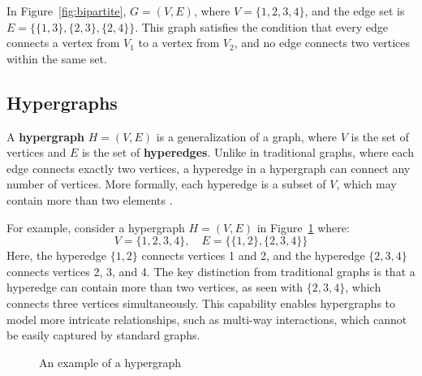 In Figure~\ref{fig:bipartite}, \( G = (V, E) \), where \( V = \{1, 2, 3, 4\} \), and the edge set is \( E = \{\{1, 3\}, \{2, 3\}, \{2, 4\}\} \). This graph satisfies the condition that every edge connects a vertex from \( V_1 \) to a vertex from \( V_2 \), and no edge connects two vertices within the same set.

\subsection{Hypergraphs}
A \textbf{hypergraph} \( H = (V, E) \) is a generalization of a graph, where \( V \) is the set of vertices and \( E \) is the set of \textbf{hyperedges}. Unlike in traditional graphs, where each edge connects exactly two vertices, a hyperedge in a hypergraph can connect any number of vertices. More formally, each hyperedge is a subset of \( V \), which may contain more than two elements \cite{cormen2009introduction}.

For example, consider a hypergraph \( H = (V, E) \) in Figure~\ref{fig:hypergraph} where:
\[
V = \{1, 2, 3, 4\}, \quad E = \{\{1, 2\}, \{2, 3, 4\}\}
\]
Here, the hyperedge \( \{1, 2\} \) connects vertices 1 and 2, and the hyperedge \( \{2, 3, 4\} \) connects vertices 2, 3, and 4. The key distinction from traditional graphs is that a hyperedge can contain more than two vertices, as seen with \( \{2, 3, 4\} \), which connects three vertices simultaneously. This capability enables hypergraphs to model more intricate relationships, such as multi-way interactions, which cannot be easily captured by standard graphs.

\begin{figure}[h]
\begin{center}
\caption{An example of a hypergraph}
\label{fig:hypergraph}
\end{center}
\end{figure}

